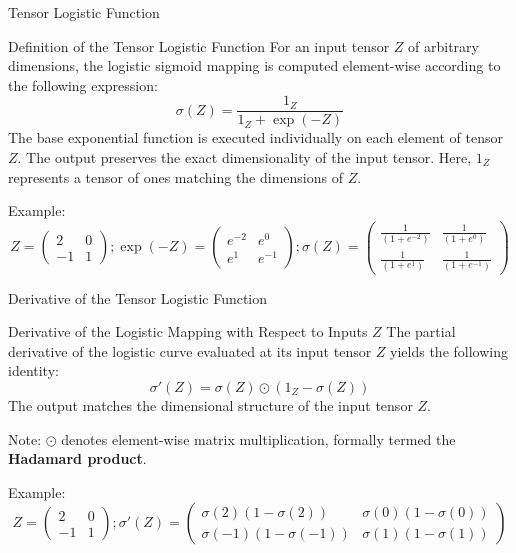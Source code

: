 \begin{frame}{Tensor Logistic Function}
	\begin{block}{Definition of the Tensor Logistic Function}
		For an input tensor $Z$ of arbitrary dimensions, the logistic sigmoid mapping is computed element-wise according to the following expression:
		\begin{equation*}
			\sigma(Z) = \frac{1_Z}{1_Z + \exp{(-Z)}}
		\end{equation*}
		The base exponential function is executed individually on each element of tensor $Z$. The output preserves the exact dimensionality of the input tensor. Here, $1_Z$ represents a tensor of ones matching the dimensions of $Z$.
	\end{block}
	Example:
	\begin{equation*}
		Z = \begin{pmatrix}
			2 & 0 \\
			-1 & 1 
		\end{pmatrix}; 
		\exp{(-Z)} = \begin{pmatrix}
			e^{-2} & e^{0} \\
			e^{1} & e^{-1} 
		\end{pmatrix};
		\sigma(Z) = \begin{pmatrix}
			\frac{1}{\left(1 + e^{-2}\right)} & \frac{1}{\left(1 + e^{0}\right)} \\
			\frac{1}{\left(1 + e^{1}\right)}  & \frac{1}{\left(1 + e^{-1}\right)}
		\end{pmatrix}
	\end{equation*}
\end{frame}

\begin{frame}{Derivative of the Tensor Logistic Function}	
	\begin{block}{Derivative of the Logistic Mapping with Respect to Inputs $Z$}
		The partial derivative of the logistic curve evaluated at its input tensor $Z$ yields the following identity:
		\begin{equation*}
			\sigma'(Z) = \sigma(Z) \odot \left(1_Z - \sigma(Z)\right)
		\end{equation*}
		The output matches the dimensional structure of the input tensor $Z$.
	\end{block}
	Note: $\odot$ denotes element-wise matrix multiplication, formally termed the \textbf{Hadamard product}.
	
	Example:
	\begin{equation*}
		Z = \begin{pmatrix}
			2 & 0 \\
			-1 & 1 
		\end{pmatrix}; 
		\sigma'(Z) = \begin{pmatrix}
			\sigma(2) (1 - \sigma(2)) & \sigma(0) (1 - \sigma(0)) \\
			\sigma(-1) (1 - \sigma(-1)) & \sigma(1) (1 - \sigma(1))
		\end{pmatrix}
	\end{equation*}	
\end{frame}

